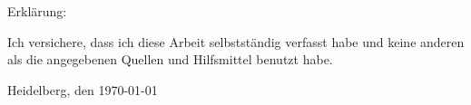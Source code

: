 \cleardoublepage
\pagestyle{empty}
\setlength{\parindent}{0em}

Erkl\"{a}rung:\par
\vspace{3\baselineskip}
Ich versichere, dass ich diese Arbeit selbstst\"{a}ndig verfasst habe und keine
anderen als die angegebenen Quellen und Hilfsmittel benutzt habe.\par
\vspace{5\baselineskip}
Heidelberg, den \today \hspace{3cm}\dotfill
